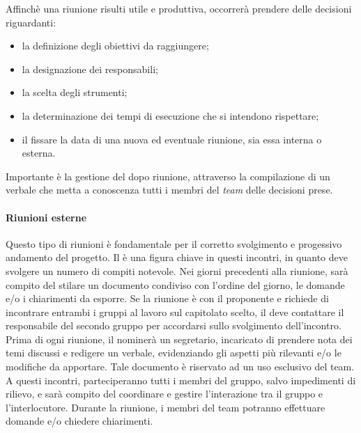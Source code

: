 			Affinchè una riunione risulti utile e produttiva, occorrerà prendere delle decisioni riguardanti:
			\begin{itemize}
				\item
				la definizione degli obiettivi da raggiungere;
				\item
				la designazione dei responsabili;
				\item
				la scelta degli strumenti;
				\item
				la determinazione dei tempi di esecuzione che si intendono rispettare;
				\item
				il fissare la data di una nuova ed eventuale riunione, sia essa interna o esterna.
			\end{itemize}
			
			Importante è la gestione del dopo riunione, attraverso la compilazione di un verbale che metta a conoscenza tutti i membri del \textit{team} delle decisioni prese.
		
			\paragraph{Riunioni esterne}
			Questo tipo di riunioni è fondamentale per il corretto svolgimento e progessivo andamento del progetto.
			Il \textit{\RdP} è una figura chiave in questi incontri, in quanto deve svolgere un numero di compiti notevole.
			Nei giorni precedenti alla riunione, sarà compito del \textit{\RdP} stilare un documento condiviso con l'ordine del giorno, le domande e/o i chiarimenti da esporre. Se la riunione è con il proponente e richiede di incontrare entrambi i gruppi al lavoro sul capitolato scelto, il \textit{\RdP} deve contattare il responsabile del secondo gruppo per accordarsi sullo svolgimento dell'incontro. Prima di ogni riunione, il \textit{\RdP} nominerà un segretario, incaricato di prendere nota dei temi discussi e redigere un verbale, evidenziando gli aspetti più rilevanti e/o le modifiche da apportare. Tale documento è riservato ad un uso esclusivo del team.
			A questi incontri, parteciperanno tutti i membri del gruppo, salvo impedimenti di rilievo, e sarà compito del \textit{\RdP} coordinare e gestire l'interazione tra il gruppo e l'interlocutore. Durante la riunione, i membri del team potranno effettuare domande e/o chiedere chiarimenti. 
			
